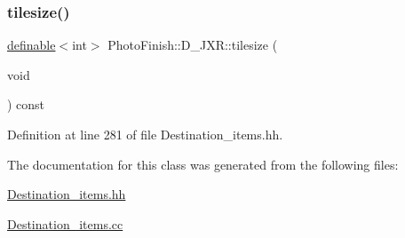 \subsubsection{\texorpdfstring{tilesize()}{tilesize()}}
{\footnotesize\ttfamily \hyperlink{class_photo_finish_1_1definable}{definable}$<$int$>$ Photo\+Finish\+::\+D\+\_\+\+J\+X\+R\+::tilesize (\begin{DoxyParamCaption}\item[{void}]{ }\end{DoxyParamCaption}) const\hspace{0.3cm}{\ttfamily [inline]}}



Definition at line 281 of file Destination\+\_\+items.\+hh.



The documentation for this class was generated from the following files\+:\begin{DoxyCompactItemize}
\item 
\hyperlink{_destination__items_8hh}{Destination\+\_\+items.\+hh}\item 
\hyperlink{_destination__items_8cc}{Destination\+\_\+items.\+cc}\end{DoxyCompactItemize}
